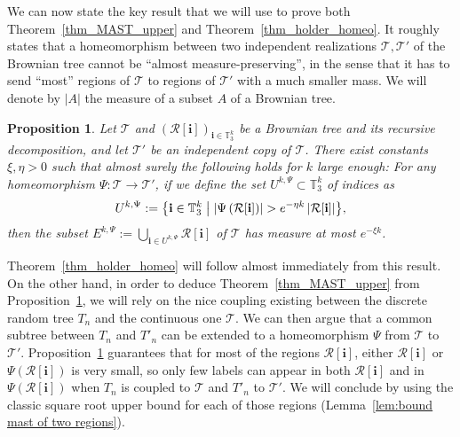 \documentclass[11pt]{article}
\newcommand{\benstq}[2]{\bigl\{#1\bigm|#2\bigr\}}
\newcommand{\Tt}{\mathcal{T}}
\newcommand{\Rr}{\mathcal{R}}
\newcommand{\ii}{\mathbf{i}}
\theoremstyle{plain}
\newtheorem{proposition}[theorem]{Proposition}
\theoremstyle{definition}
\numberwithin{equation}{section}
\begin{document}
We can now state the key result that we will use to prove both Theorem~\ref{thm_MAST_upper} and Theorem~\ref{thm_holder_homeo}.
It roughly states that a homeomorphism between two independent rea\-lizations $\Tt, \Tt'$ of the Brownian tree cannot be ``almost measure-preserving'', in the sense that it has to send ``most'' regions of $\Tt$ to regions of $\Tt'$ with a much smaller mass. We will denote by $|A|$ the measure of a subset $A$ of a Brownian tree.
\begin{proposition}\label{prop_homeo_mass}
Let $\Tt$ and $\left( \Rr[\ii] \right)_{\ii \in \mathbb{T}_3^k}$ be a Brownian tree and its recursive decomposition, and let $\Tt'$ be an independent copy of $\Tt$. There exist constants $\xi, \eta>0$ such that almost surely the following holds for $k$ large enough:
For any homeomorphism $\Psi : \Tt \to \Tt'$,
if we define the set $U^{k,\Psi} \subset \mathbb{T}_3^k$ of indices as
\begin{align*}
U^{k,\Psi}:= \benstq{\ii \in \mathbb{T}_3^k}{\left| \Psi \left( \Rr[\ii] \right) \right| > e^{-\eta k} \left| \Rr[\ii] \right|},
\end{align*}
then the subset
$
E^{k,\Psi}:= \bigcup_{\ii \in U^{k,\Psi}} \Rr[\ii]$ of $\Tt
$
has measure at most $e^{-\xi k}$.
\end{proposition}
Theorem~\ref{thm_holder_homeo} will follow almost immediately from this result.
On the other hand, in order to deduce Theorem~\ref{thm_MAST_upper} from Proposition~\ref{prop_homeo_mass}, we will rely on the nice coupling existing between the discrete random tree $T_n$ and the continuous one $\Tt$.
We can then argue that a common subtree between $T_n$ and $T'_n$ can be extended to a homeomorphism $\Psi$ from $\Tt$ to $\Tt'$.
Proposition~\ref{prop_homeo_mass} guarantees that for most of the regions $\Rr[\ii]$, either $\Rr[\ii]$ or $\Psi(\Rr[\ii])$ is very small, so only few labels can appear in both $\Rr[\ii]$ and in $\Psi(\Rr[\ii])$ when $T_n$ is coupled to $\Tt$ and $T'_n$ to $\Tt'$. We will conclude by using the classic square root upper bound for each of those regions (Lemma~\ref{lem:bound mast of two regions}).
\end{document}
